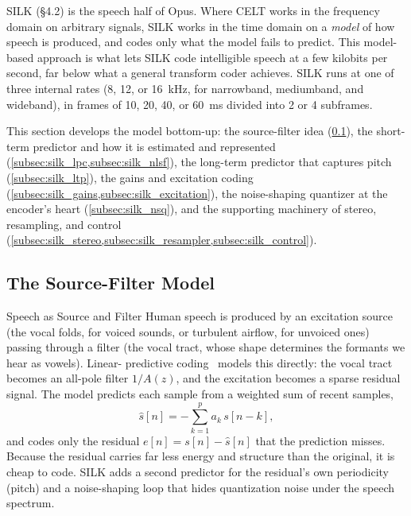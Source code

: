 SILK (\S4.2) is the speech half of Opus. Where CELT works in the frequency
domain on arbitrary signals, SILK works in the time domain on a \emph{model} of
how speech is produced, and codes only what the model fails to predict. This
model-based approach is what lets SILK code intelligible speech at a few
kilobits per second, far below what a general transform coder achieves. SILK runs
at one of three internal rates (8, 12, or 16~kHz, for narrowband, mediumband, and
wideband), in frames of 10, 20, 40, or 60~ms divided into 2 or 4 subframes.

This section develops the model bottom-up: the source-filter idea
(\cref{subsec:silk_model}), the short-term predictor and how it is estimated and
represented (\cref{subsec:silk_lpc,subsec:silk_nlsf}), the long-term predictor
that captures pitch (\cref{subsec:silk_ltp}), the gains and excitation coding
(\cref{subsec:silk_gains,subsec:silk_excitation}), the noise-shaping quantizer at
the encoder's heart (\cref{subsec:silk_nsq}), and the supporting machinery of
stereo, resampling, and control (\cref{subsec:silk_stereo,subsec:silk_resampler,subsec:silk_control}).

\subsection{The Source-Filter Model}\label{subsec:silk_model}

\begin{concept}{Speech as Source and Filter}
  Human speech is produced by an excitation source (the vocal folds, for voiced
  sounds, or turbulent airflow, for unvoiced ones) passing through a filter (the
  vocal tract, whose shape determines the formants we hear as vowels). Linear-
  predictive coding~\cite{makhoul1975linear,rabiner1978digital} models this
  directly: the vocal tract becomes an all-pole filter $1/A(z)$, and the
  excitation becomes a sparse residual signal. The model predicts each sample
  from a weighted sum of recent samples,
  \begin{equation}\label{eq:lpc_predict}
    \hat{s}[n] = -\sum_{k=1}^{p} a_k\, s[n-k],
  \end{equation}
  and codes only the residual $e[n] = s[n] - \hat{s}[n]$ that the prediction
  misses. Because the residual carries far less energy and structure than the
  original, it is cheap to code. SILK adds a second predictor for the residual's
  own periodicity (pitch) and a noise-shaping loop that hides quantization noise
  under the speech spectrum.
\end{concept}

